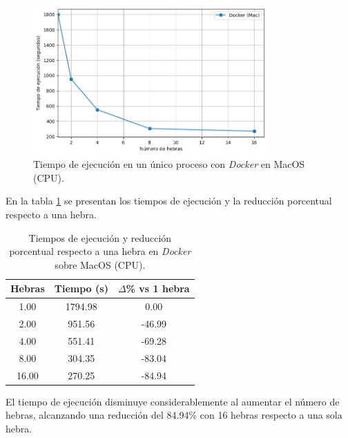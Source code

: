 \begin{figure}[ht]
    \centering
    \includegraphics[width=0.8\textwidth]{imagenes/cap5/single-node_mac_docker_time.png}
    \caption{Tiempo de ejecución en un único proceso con \textit{Docker} en MacOS (CPU).}
    \label{fig:single-node_mac_docker_time}
\end{figure}

En la tabla \ref{tab:single-node_mac_docker_time} se presentan los tiempos de ejecución y la reducción porcentual respecto a una hebra.

\begin{table}[ht]
    \centering
    \begin{tabular}{|c|c|c|}
        \hline
        \textbf{Hebras} & \textbf{Tiempo (s)} & \textbf{$\Delta$\% vs 1 hebra} \\
        \hline
        1.00            & 1794.98             & 0.00                           \\
        2.00            & 951.56              & -46.99                         \\
        4.00            & 551.41              & -69.28                         \\
        8.00            & 304.35              & -83.04                         \\
        16.00           & 270.25              & -84.94                         \\
        \hline
    \end{tabular}
    \caption{Tiempos de ejecución y reducción porcentual respecto a una hebra en \textit{Docker} sobre MacOS (CPU).}
    \label{tab:single-node_mac_docker_time}
\end{table}

El tiempo de ejecución disminuye considerablemente al aumentar el número de hebras, alcanzando una reducción del 84.94\% con 16 hebras respecto a una sola hebra.

